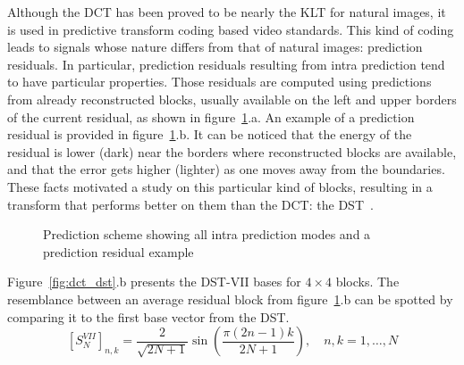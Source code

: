 \documentclass[11pt,a4paper,openright,twoside]{book}
\numberwithin{equation}{section} %
\begin{document}
Although the \ac{DCT} has been proved to be nearly the \ac{KLT} for natural
images, it is used in predictive transform coding based video standards.
This kind of coding leads to signals whose nature differs from that of
natural images: prediction residuals.
In particular, prediction residuals resulting from intra prediction tend
to have particular properties.
Those residuals are computed using predictions from already
reconstructed blocks, usually available on the left and upper borders of
the current residual, as shown in figure~\ref{fig:pred_scheme}.a.
An example of a prediction residual is provided in
figure~\ref{fig:pred_scheme}.b.
It can be noticed that the energy of the residual is lower (dark) near
the borders where reconstructed blocks are available, and that the error
gets higher (lighter) as one moves away from the boundaries.
These facts motivated a study on this particular kind of blocks,
resulting in a transform that performs better on them than the \ac{DCT}:
the \ac{DST}~\cite{han-10-spatial-adaptive-transform}.
\begin{figure}[tb]
	\centering
	\hspace{0.2\linewidth}
	\caption{Prediction scheme showing all intra prediction modes and a
	prediction residual example}
	\label{fig:pred_scheme}
\end{figure}

Figure~\ref{fig:dct_dst}.b presents the \ac{DST}-VII bases for
$4\times4$ blocks.
The resemblance between an average residual block
from figure~\ref{fig:pred_scheme}.b can be spotted by comparing it to
the first base vector from the \ac{DST}.
\begin{equation}
	{\left[S_{N}^{VII} \right]}_{n,k} =
	\frac{2}{\sqrt{2N+1}}\sin\left(\frac{\pi(2n-1)k}{2N+1}\right),
	\quad
	n,k = 1, \dots, N
	\label{eqn:dst_vii}
\end{equation}
\end{document}
